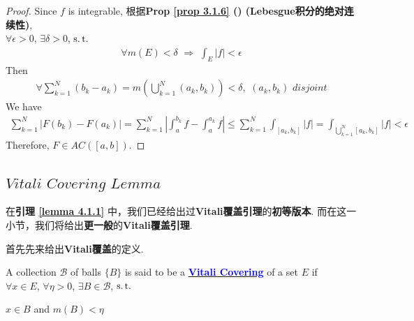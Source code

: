 \begin{defn}
\begin{rmk}
\begin{enumerate}
				\vspace{1em}
				\begin{proof}
					Since $f$ is integrable, 根据\textbf{Prop \ref{prop 3.1.6} () (Lebesgue积分的绝对连续性)}, \\
					$\forall \epsilon > 0$, $\exists \delta > 0$, $\operatorname{s.t.}$
					\begin{align}
						\forall m(E) < \delta \,\, 
						\Rightarrow \,\, \int_{E}{\left| f \right|} < \epsilon
					\end{align}
					Then
					\begin{align}
						\forall \sum_{k = 1}^{N}{(b_k - a_k)} = m\left( \bigcup_{k = 1}^{N}{(a_k , b_k)} \right) < \delta , \,\, (a_k , b_k) \,\, disjoint
					\end{align}
					We have
					\begin{align}
						\sum_{k = 1}^{N}{\left| F(b_k) - F(a_k) \right|}
						= \sum_{k = 1}^{N}{\left| \int_{a}^{b_k}{f} - \int_{a}^{a_k}{f} \right|}
						\leq \sum_{k = 1}^{N}{\int_{[a_k , b_k]}{\left| f \right|}}
						= \int_{\bigcup_{k = 1}^{N}{[a_k , b_k]}}{\left| f \right|}
						< \epsilon
					\end{align}
					Therefore, $F \in AC([a , b])$.
				\end{proof}
			\end{enumerate}
		\end{rmk}
	\end{defn}

\newpage
\subsection{$Vitali \,\, Covering \,\, Lemma$}
	在\textbf{引理 \ref{lemma 4.1.1}} 中，我们已经给出过\textbf{Vitali覆盖引理}的\textbf{初等版本}. 而在这一小节，我们将给出\textbf{更一般}的\textbf{Vitali覆盖引理}. 
	
	\vspace{1em}
	
	首先先来给出\textbf{Vitali覆盖}的定义.
	\begin{defn}\label{def 4.7.2}
		A collection $\mathcal{B}$ of balls $\{ B \}$ is said to be a \underline{\textcolor{blue}{\textbf{Vitali Covering}}} of a set $E$ if \\
		$\forall x \in E$, $\forall \eta > 0$, $\exists B \in \mathcal{B}$, $\operatorname{s.t.}$ 
		\begin{center}
			$x \in B$ and $m(B) < \eta$
		\end{center}
	\end{defn}
	
